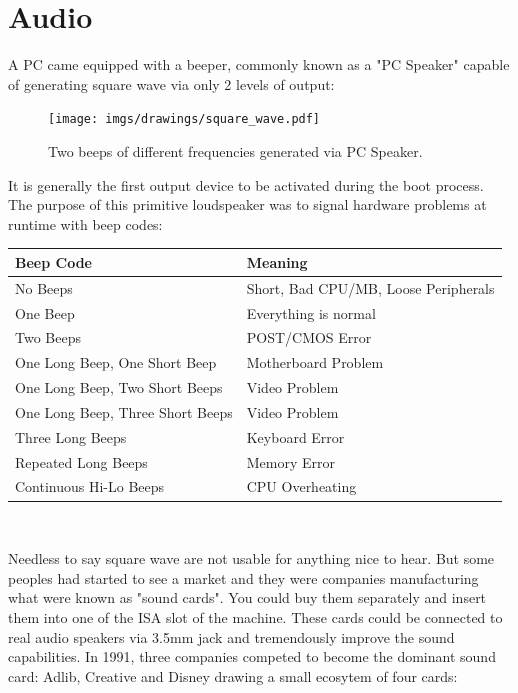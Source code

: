 \documentclass[book.tex]{subfiles}
\begin{document}
\section{Audio}
A PC came equipped with a beeper, commonly known as a "PC Speaker" capable of generating square wave via only 2 levels of output:\\
\par
 \begin{figure}[H]
\centering
\texttt{[image: imgs/drawings/square\_wave.pdf]}
\caption{Two beeps of different frequencies generated via PC Speaker.}
\end{figure}

\par
 It is generally the first output device to be activated during the boot process. The purpose of this primitive loudspeaker was to signal hardware problems at runtime with beep codes:\\
\par
\begin{tabularx}{\textwidth}{l l}
\textbf{Beep Code} & \textbf{Meaning}  \\ \hline
No Beeps                         & Short, Bad CPU/MB, Loose Peripherals \\ \hline
One Beep                         & Everything is normal\\ \hline
Two Beeps                        & POST/CMOS Error \\ \hline 
One Long Beep, One Short Beep    & Motherboard Problem \\ \hline
One Long Beep, Two Short Beeps   & Video Problem \\ \hline
One Long Beep, Three Short Beeps & Video Problem \\ \hline
Three Long Beeps                 & Keyboard Error \\ \hline
Repeated Long Beeps              & Memory Error \\ \hline
Continuous Hi-Lo Beeps           & CPU Overheating \\ \hline
\end{tabularx}\\
\bigskip
\par
Needless to say square wave are not usable for anything nice to hear. But some peoples had started to see a market and they were companies manufacturing what were known as "sound cards". You could buy them separately and insert them into one of the ISA slot of the machine. These cards could be connected to real audio speakers via 3.5mm jack and tremendously improve the sound capabilities. In 1991, three companies competed to become the dominant sound card: Adlib, Creative and Disney drawing a small ecosytem of four cards:\\
\end{document}
